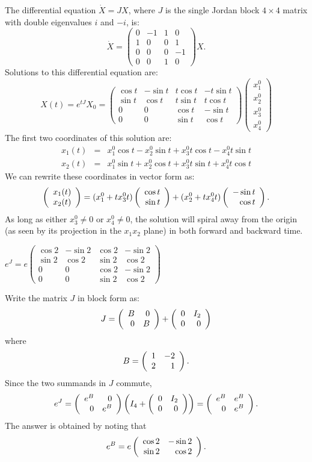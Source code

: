 \documentclass{ximera}
\begin{document}
  The differential equation $\dot{X}=JX$, where $J$ is the 
single Jordan block $4\times 4$ matrix with double eigenvalues $i$ and $-i$,
is:
\[
\dot{X} = \left(\begin{array}{rr|rr}
 0 & -1 & 1 &  0 \\
 1 &  0 & 0 &  1 \\
\hline
 0 &  0 & 0 & -1\\
 0 &  0 & 1 &  0
\end{array}\right)X.  
\]
Solutions to this differential equation are:
\[
X(t) = e^{tJ}X_0 = \left(\begin{array}{rrrr}
  \cos t & -\sin t & t\cos t & -t\sin t\\
  \sin t &  \cos t & t\sin t &  t\cos t\\
     0   &    0    &  \cos t &  -\sin t\\
     0   &    0    &  \sin t &   \cos t  
\end{array}\right)
\left(\begin{array}{r} x_1^0 \\  x_2^0 \\ x_3^0 \\ x_4^0 \end{array}\right)
\]
The first two coordinates of this solution are:
\begin{eqnarray*}
x_1(t) & = & x_1^0\cos t - x_2^0\sin t + x_3^0t\cos t - x_4^0t\sin t\\
x_2(t) & = & x_1^0\sin t + x_2^0\cos t + x_3^0t\sin t + x_4^0t\cos t
\end{eqnarray*}
We can rewrite these coordinates in vector form as:
\[
\left(\begin{array}{r} x_1(t) \\ x_2(t)\end{array}\right) =
(x_1^0 + tx_3^0t)\left(\begin{array}{r} \cos t \\ \sin t\end{array}\right) + 
(x_2^0 + tx_4^0t)\left(\begin{array}{r} -\sin t \\ \cos t\end{array}\right).
\] 
As long as either $x_3^0\neq 0$ or $x_4^0\neq 0$, the solution will spiral 
away from the origin (as seen by its projection in the $x_1x_2$ plane) in 
both forward and backward time.

  \ans $e^J = e\left(\begin{array}{rrrr}
  \cos 2 & -\sin 2 & \cos 2 & -\sin 2\\
  \sin 2 &  \cos 2 & \sin 2 &  \cos 2\\
     0   &    0    &  \cos 2 &  -\sin 2\\
     0   &    0    &  \sin 2 &   \cos 2  
\end{array}\right)$

\soln Write the matrix $J$ in block form as:
\[
J = \left(\begin{array}{rr} B & 0\\ 0 &B\end{array}\right) + \left(\begin{array}{rr} 0 & I_2\\ 0 &0\end{array}\right)
\]
where 
\[
B = \left(\begin{array}{rr} 1 & -2\\ 2 &1\end{array}\right).
\]
Since the two summands in $J$ commute, 
\[
e^J = \left(\begin{array}{rr} e^B & 0\\ 0 &e^B\end{array}\right)\left(I_4 + \left(\begin{array}{rr} 0 & I_2\\ 0 &0\end{array}\right)\right)
= \left(\begin{array}{rr} e^B & e^B\\ 0 &e^B\end{array}\right).
\]
The answer is obtained by noting that 
\[
e^B = e\left(\begin{array}{rr} \cos 2 & -\sin 2\\ \sin 2 &\cos 2\end{array}\right).
\]
\end{document}
